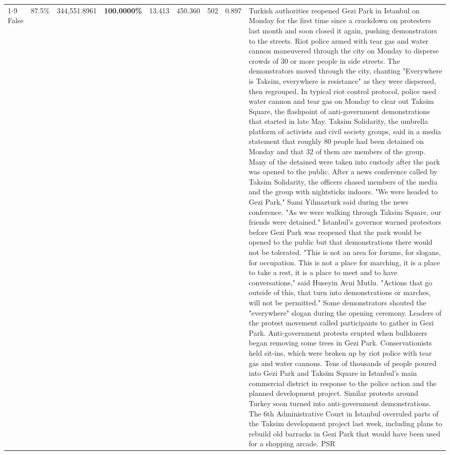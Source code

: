 \begin{table}[H]
\begin{tabular}{lllrlllll}
\cline{1-9}
False & 87.5\% & 344,551.8961 & \bfseries \color{red} 100.0000\% & 13.413 & 450.360 & 502 & 0.897 & Turkish authorities reopened Gezi Park in Istanbul on Monday for the first time since a crackdown on protesters last month and soon closed it again, pushing demonstrators to the streets. Riot police armed with tear gas and water cannon maneuvered through the city on Monday to disperse crowds of 30 or more people in side streets. The demonstrators moved through the city, chanting "Everywhere is Taksim, everywhere is resistance" as they were dispersed, then regrouped. In typical riot control protocol, police used water cannon and tear gas on Monday to clear out Taksim Square, the flashpoint of anti-government demonstrations that started in late May. Taksim Solidarity, the umbrella platform of activists and civil society groups, said in a media statement that roughly 80 people had been detained on Monday and that 32 of them are members of the group. Many of the detained were taken into custody after the park was opened to the public. After a news conference called by Taksim Solidarity, the officers chased members of the media and the group with nightsticks indoors. "We were headed to Gezi Park," Sami Yilmazturk said during the news conference. "As we were walking through Taksim Square, our friends were detained." Istanbul's governor warned protestors before Gezi Park was reopened that the park would be opened to the public but that demonstrations there would not be tolerated. "This is not an area for forums, for slogans, for occupation. This is not a place for marching, it is a place to take a rest, it is a place to meet and to have conversations," said Huseyin Avni Mutlu. "Actions that go outside of this, that turn into demonstrations or marches, will not be permitted." Some demonstrators shouted the "everywhere" slogan during the opening ceremony. Leaders of the protest movement called participants to gather in Gezi Park. Anti-government protests erupted when bulldozers began removing some trees in Gezi Park. Conservationists held sit-ins, which were broken up by riot police with tear gas and water cannons. Tens of thousands of people poured into Gezi Park and Taksim Square in Istanbul's main commercial district in response to the police action and the planned development project. Similar protests around Turkey soon turned into anti-government demonstrations. The 6th Administrative Court in Istanbul overruled parts of the Taksim development project last week, including plans to rebuild old barracks in Gezi Park that would have been used for a shopping arcade. PSR \\

\end{tabular}
\end{table}

